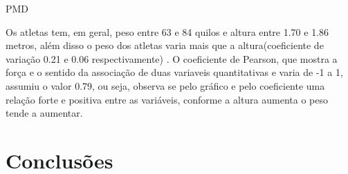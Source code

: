 \documentclass[
  letterpaper,
  DIV=11,
  numbers=noendperiod]{scrartcl}
\begin{document}
PMD %

Os atletas tem, em geral, peso entre 63 e 84 quilos e altura entre 1.70
e 1.86 metros, além disso o peso dos atletas varia mais que a
altura(coeficiente de variação 0.21 e 0.06 respectivamente) . O
coeficiente de Pearson, que mostra a força e o sentido da associação de
duas variaveis quantitativas e varia de -1 a 1, assumiu o valor 0.79, ou
seja, observa se pelo gráfico e pelo coeficiente uma relação forte e
positiva entre as variáveis, conforme a altura aumenta o peso tende a
aumentar.

\section{Conclusões}\label{conclusuxf5es}
\end{document}
